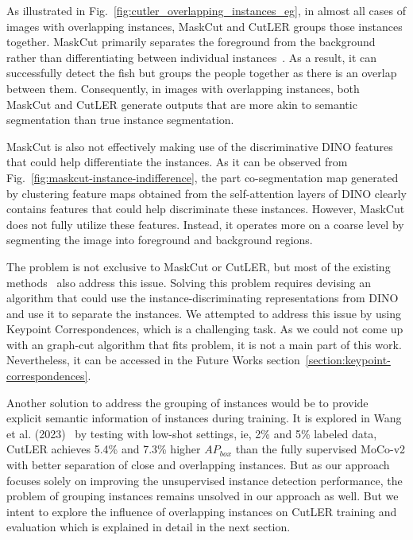 As illustrated in Fig.~\ref{fig:cutler_overlapping_instances_eg}, in almost all cases of images with overlapping instances, MaskCut and CutLER groups those instances together. MaskCut primarily separates the foreground from the background rather than differentiating between individual instances~\cite{engstler2023understanding}. As a result, it can successfully detect the fish but groups the people together as there is an overlap between them. Consequently, in images with overlapping instances, both MaskCut and CutLER generate outputs that are more akin to semantic segmentation than true instance segmentation.

MaskCut is also not effectively making use of the discriminative  DINO features that could help differentiate the instances. As it can be observed from Fig.~\ref{fig:maskcut-instance-indifference}, the part co-segmentation map generated by clustering feature maps obtained from the self-attention layers of DINO clearly contains features that could help discriminate these instances. However, MaskCut does not fully utilize these features. Instead, it operates more on a coarse level by segmenting the image into foreground and background regions. 

The problem is not exclusive to MaskCut or CutLER, but most of the existing methods~\cite{engstler2023understanding, cond1_support_2, Wang_2022_CVPR} also address this issue. Solving this problem requires devising an algorithm that could use the instance-discriminating representations from DINO and use it to separate the instances. We attempted to address this issue by using Keypoint Correspondences, which is a challenging task. As we could not come up with an graph-cut algorithm that fits problem, it is not a main part of this work. Nevertheless, it can be accessed in the Future Works section~\ref{section:keypoint-correspondences}.

Another solution to address the grouping of instances would be to provide explicit semantic information of instances during training. It is explored in Wang et al. (2023)~\cite{wang2023cut} by testing with low-shot settings, ie, 2\% and 5\% labeled data, CutLER achieves 5.4\% and 7.3\% higher \(AP_{box}\) than the fully supervised MoCo-v2 with better separation of close and overlapping instances. But as our approach focuses solely on improving the unsupervised instance detection performance, the problem of grouping instances remains unsolved in our approach as well. But we intent to explore the influence of overlapping instances on CutLER training and evaluation which is explained in detail in the next section.

